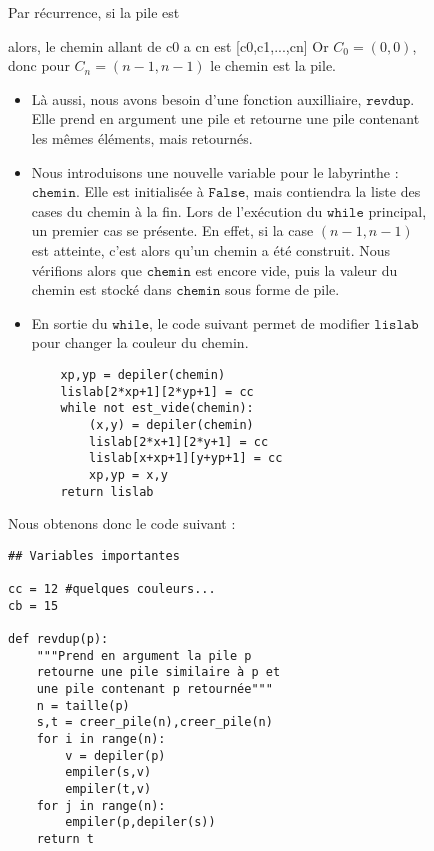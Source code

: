 \documentclass[11pt,a4paper]{article}
\begin{document}
\begin{figure}
\par 
Par récurrence, si la pile est
alors, le chemin allant de c0 a cn est [c0,c1,...,cn] Or $C_0 = (0,0)$, donc pour $C_n = (n-1,n-1)$ le chemin est la pile.
\begin{itemize}
	\item Là aussi, nous avons besoin d'une fonction auxilliaire, $\mathtt{revdup}$. Elle prend en argument une pile et retourne une pile contenant les mêmes éléments, mais retournés.
	\item Nous introduisons une nouvelle variable pour le labyrinthe : $\mathtt{chemin}$. Elle est initialisée à $\mathtt{False}$, mais contiendra la liste des cases du chemin à la fin. Lors de l'exécution du $\mathtt{while}$ principal, un premier cas se présente. En effet, si la case $(n-1,n-1)$ est atteinte, c'est alors qu'un chemin a été construit. Nous vérifions alors que $\mathtt{chemin}$ est encore vide, puis la valeur du chemin est stocké dans $\mathtt{chemin}$ sous forme de pile.
	\item En sortie du $\mathtt{while}$, le code suivant permet de modifier $\mathtt{lislab}$ pour changer la couleur du chemin.
\begin{lstlisting}
	xp,yp = depiler(chemin)
    lislab[2*xp+1][2*yp+1] = cc
    while not est_vide(chemin):
        (x,y) = depiler(chemin)
        lislab[2*x+1][2*y+1] = cc
        lislab[x+xp+1][y+yp+1] = cc
        xp,yp = x,y
    return lislab
\end{lstlisting}
\end{itemize}
Nous obtenons donc le code suivant :
\begin{lstlisting}
## Variables importantes

cc = 12 #quelques couleurs...
cb = 15

def revdup(p):
    """Prend en argument la pile p
    retourne une pile similaire à p et
    une pile contenant p retournée"""
    n = taille(p)
    s,t = creer_pile(n),creer_pile(n)
    for i in range(n):
        v = depiler(p)
        empiler(s,v)
        empiler(t,v)
    for j in range(n):
        empiler(p,depiler(s))
    return t
    

\end{lstlisting}
\end{figure}
\end{document}
